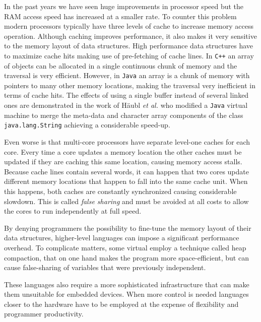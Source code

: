 In the past years we have seen huge improvements in processor speed but the RAM access speed has increased at
a smaller rate. To counter this problem modern processors typically have three levels of cache to increase
memory access operation. Although caching improves performance, it also makes it very sensitive to the memory
layout of data structures. High performance data structures have to maximize cache hits making use of
pre-fetching of cache lines. In \texttt{C++} an array of objects can be allocated in a single continuous chunk of memory
and the traversal is very efficient. However, in \texttt{Java} an array is a chunk of memory with pointers to
many other memory locations, making the traversal very inefficient in terms of cache hits. The effects of
using a single buffer instead of several linked ones are demonstrated in the work of Häubl \emph{et al.} who
modified a \texttt{Java} virtual machine to merge the meta-data and character array components of the class
\texttt{java.lang.String} achieving a considerable speed-up.

Even worse is that multi-core processors have separate level-one caches for each core. Every time a
core updates a memory location the other caches must be updated if they are caching this same location, causing
memory access stalls. Because cache lines contain several words, it can happen that two cores update
different memory locations that happen to fall into the same cache unit. When this happens, both caches
are constantly synchronized causing considerable slowdown. This is called \emph{false sharing} and must
be avoided at all costs to allow the cores to run independently at full speed.

By denying programmers the possibility to fine-tune the memory layout of their data structures,
higher-level languages can impose a significant performance overhead. To complicate matters, some virtual
employ a technique called heap compaction, that on one hand makes the program more space-efficient, but can
cause false-sharing of variables that were previously independent.

These languages also require a more sophisticated infrastructure that can make them unsuitable for embedded devices.
When more control is needed languages closer to the hardware have to be employed at the expense
of flexibility and programmer productivity.


